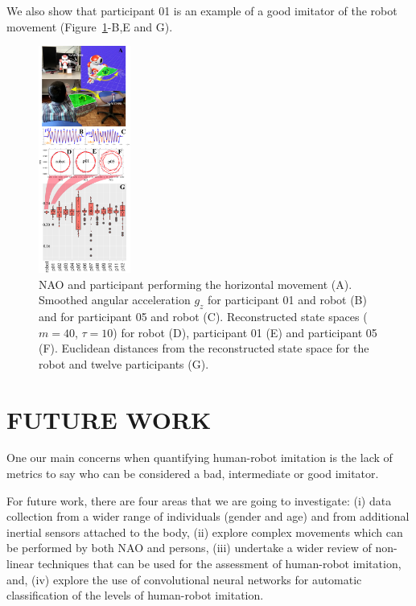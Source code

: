 \documentclass{sig-alternate-05-2015}
\begin{document}
We also show that participant 01 is an example of a good imitator of the robot movement
(Figure~\ref{fig:main}-B,E and G).




\begin{figure}[ht]
\centering
\includegraphics[width=0.27\textwidth]{fig06}
\caption{
NAO and participant performing the horizontal movement (A). 
Smoothed angular acceleration $g_z$ for participant 01  and robot (B)
and for participant 05 and robot (C).
Reconstructed state spaces  ($m=40$, $\tau=10$) for robot (D), participant 01 (E) and participant 05 (F).
Euclidean distances from the reconstructed state space for the robot and twelve participants (G).
}
\label{fig:main}
\end{figure}






\section{FUTURE WORK}
One our main concerns when quantifying human-robot imitation
is the lack of metrics to say who can be considered a bad, intermediate or good imitator.

For future work, there are four areas that we are going to investigate:
(i) data collection from a wider range of individuals (gender and age)
and from additional inertial sensors attached to the body,
(ii) explore complex movements which can be performed by both NAO and persons,
(iii) undertake a wider review of non-linear techniques that can be used for 
the assessment of human-robot imitation, and, 
(iv) explore the use of convolutional neural networks for automatic 
classification of the levels of human-robot imitation.
\end{document}
